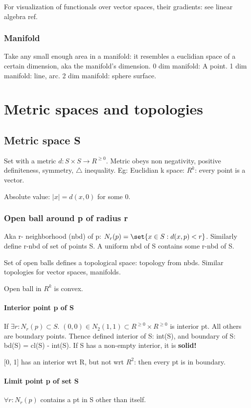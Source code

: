 \documentclass[oneside, article]{memoir}
\begin{document}
For visualization of functionals over vector spaces, their gradients: see linear algebra ref.

\section{Manifold}
Take any small enough area in a manifold: it resembles a euclidian space of a certain dimension, aka the manifold's dimension. 0 dim manifold: A point. 1 dim manifold: line, arc. 2 dim manifold: sphere surface.

\part{Metric spaces and topologies}
\chapter{Metric space S}
Set with a metric $d: S\times S \to R^{\geq 0}$. Metric obeys non negativity, positive definiteness, symmetry, $\triangle$ inequality. Eg: Euclidian k space: $R^{k}$: every point is a vector.

Absolute value: $|x| = d(x,0)$ for some 0.

\section{Open ball around p of radius r}
Aka r- neighborhood (nbd) of p: $N_{r}(p) = \set{x \in S: d(x,p) < r}$. Similarly define r-nbd of set of points S. A uniform nbd of S contains some r-nbd of S.

Set of open balls defines a topological space: topology from nbds. Similar topologies for vector spaces, manifolds.

Open ball in $R^{k}$ is convex.

\subsection{Interior point p of S}
If $\exists r: N_{r}(p) \subset S$. $(0,0) \in N_{2}(1,1) \subset R^{\geq 0} \times R^{\geq 0}$ is interior pt. All others are boundary points. Thence defined interior of S: int(S), and boundary of S: bd(S) = cl(S) - int(S). If S has a non-empty interior, it is \textbf{solid!}

[0, 1] has an interior wrt R, but not wrt $R^{2}$: then every pt is in boundary.

\subsection{Limit point p of set S}
$\forall r: N_{r}(p)$ contains a pt in S other than itself.
\end{document}
